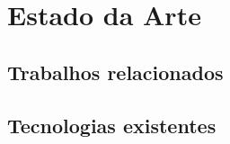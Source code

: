\chapter{Estado da Arte}
\label{sec:2-EstadoArte}

\section{Trabalhos relacionados}



\section{Tecnologias existentes}

